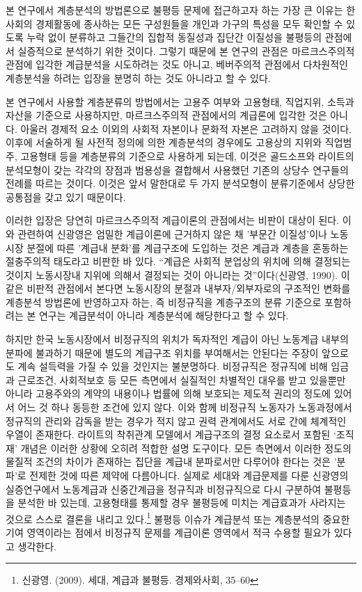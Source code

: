 \documentclass[
  letterpaper,
  DIV=11,
  numbers=noendperiod]{scrartcl}
\begin{document}
본 연구에서 계층분석의 방법론으로 불평등 문제에 접근하고자 하는 가장 큰
이유는 한 사회의 경제활동에 종사하는 모든 구성원들을 개인과 가구의
특성을 모두 확인할 수 있도록 누락 없이 분류하고 그들간의 집합적 동질성과
집단간 이질성을 불평등의 관점에서 실증적으로 분석하기 위한 것이다.
그렇기 때문에 본 연구의 관점은 마르크스주의적 관점에 입각한 계급분석을
시도하려는 것도 아니고, 베버주의적 관점에서 다차원적인 계층분석을 하려는
입장을 분명히 하는 것도 아니라고 할 수 있다.

본 연구에서 사용할 계층분류의 방법에서는 고용주 여부와 고용형태,
직업지위, 소득과 자산을 기준으로 사용하지만, 마르크스주의적 관점에서의
계급론에 입각한 것은 아니다. 아울러 경제적 요소 이외의 사회적 자본이나
문화적 자본은 고려하지 않을 것이다. 이후에 서술하게 될 사전적 정의에
의한 계층분석의 경우에도 고용상의 지위와 직업범주, 고용형태 등을
계층분류의 기준으로 사용하게 되는데, 이것은 골드소프와 라이트의
분석모형이 갖는 각각의 장점과 범용성을 결합해서 사용했던 기존의 상당수
연구들의 전례를 따르는 것이다. 이것은 앞서 말한대로 두 가지 분석모형이
분류기준에서 상당한 공통점을 갖고 있기 때문이다.

이러한 입장은 당연히 마르크스주의적 계급이론의 관점에서는 비판이 대상이
된다. 이와 관련하여 신광영은 엄밀한 계급이론에 근거하지 않은 채 '부문간
이질성'이나 노동시장 분절에 따른 '계급내 분화'를 계급구조에 도입하는
것은 계급과 계층을 혼동하는 절충주의적 태도라고 비판한 바 있다. ``계급은
사회적 분업상의 위치에 의해 결정되는 것이지 노동시장내 지위에 의해서
결정되는 것이 아니라는 것''이다(신광영, 1990). 이같은 비판적 관점에서
본다면 노동시장의 분절과 내부자/외부자로의 구조적인 변화를 계층분석
방법론에 반영하고자 하는, 즉 비정규직을 계층구조의 분류 기준으로
포함하려는 본 연구는 계급분석이 아니라 계층분석에 해당한다고 할 수 있다.

하지만 한국 노동시장에서 비정규직의 위치가 독자적인 계급이 아닌 노동계급
내부의 분파에 불과하기 때문에 별도의 계급구조 위치를 부여해서는 안된다는
주장이 앞으로도 계속 설득력을 가질 수 있을 것인지는 불분명하다.
비정규직은 정규직에 비해 임금과 근로조건, 사회적보호 등 모든 측면에서
실질적인 차별적인 대우를 받고 있을뿐만 아니라 고용주와의 계약의 내용이나
법률에 의해 보호되는 제도적 권리의 정도에 있어서 어느 것 하나 동등한
조건에 있지 않다. 이와 함께 비정규직 노동자가 노동과정에서 정규직의
관리와 감독을 받는 경우가 적지 않고 권력 관계에서도 서로 간에 체계적인
우열이 존재한다. 라이트의 착취관계 모델에서 계급구조의 결정 요소로서
포함된 `조직재' 개념은 이러한 상황에 오히려 적합한 설명 도구이다. 모든
측면에서 이러한 정도의 물질적 조건의 차이가 존재하는 집단을 계급내
분파로서만 다루어야 한다는 것은 '분파'로 전제한 것에 따른 제약에
다름아니다. 실제로 세대와 계급문제를 다룬 신광영의 실증연구에서
노동계급과 신중간계급을 정규직과 비정규직으로 다시 구분하여 불평등을
분석한 바 있는데, 고용형태를 통제할 경우 불평등에 미치는 계급효과가
사라지는 것으로 스스로 결론을 내리고 있다.\footnote{신광영. (2009).
  세대, 계급과 불평등. 경제와사회, 35--60} 불평등 이슈가 계급분석 또는
계층분석의 중요한 기여 영역이라는 점에서 비정규직 문제를 계급이론
영역에서 적극 수용할 필요가 있다고 생각한다.
\end{document}
